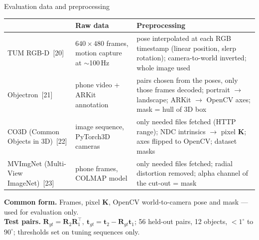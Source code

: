 \documentclass[aspectratio=169,10pt]{beamer}
\newcommand{\R}{\mathbf{R}}
\newcommand{\tv}{\mathbf{t}}
\newcommand{\K}{\mathbf{K}}
\newcommand{\head}[1]{{\usebeamercolor[fg]{structure}\textbf{#1}}}
\newcommand{\cit}[1]{{\scriptsize\textcolor{black!55}{[#1]}}}
\begin{document}
\begin{frame}{Evaluation data and preprocessing}
  \footnotesize
  \renewcommand{\arraystretch}{1.25}
  \begin{tabular}{@{}>{\raggedright\arraybackslash}p{}>{\raggedright\arraybackslash}p{}>{\raggedright\arraybackslash}p{}@{}}
    \toprule
    \head{Dataset} & \head{Raw data} & \head{Preprocessing}\\
    \midrule
    TUM RGB-D~\cit{20} & $640\times480$ frames, motion capture at $\sim$100\,Hz & pose interpolated at each RGB timestamp (linear position, slerp rotation); camera-to-world inverted; whole image used\\
    Objectron~\cit{21} & phone video + ARKit annotation & pairs chosen from the poses, only those frames decoded; portrait $\to$ landscape; ARKit $\to$ OpenCV axes; mask = hull of 3D box\\
    CO3D (Common Objects in 3D)~\cit{22} & image sequence, PyTorch3D cameras & only needed files fetched (HTTP range); NDC intrinsics $\to$ pixel $\K$; axes flipped to OpenCV; dataset masks\\
    MVImgNet (Multi-View ImageNet)~\cit{23} & phone frames, COLMAP model & only needed files fetched; radial distortion removed; alpha channel of the cut-out = mask\\
    \bottomrule
  \end{tabular}\par\vspace{6pt}
  \small
  \head{Common form.} Frames, pixel $\K$, OpenCV world-to-camera pose and mask --- used for evaluation only.\\[2pt]
  \head{Test pairs.} $\R_{gt}=\R_2\R_1^\top,\ \tv_{gt}=\tv_2-\R_{gt}\tv_1$; 56 held-out pairs, 12 objects, $<1^\circ$ to $90^\circ$; thresholds set on tuning sequences only.
\end{frame}
\end{document}
